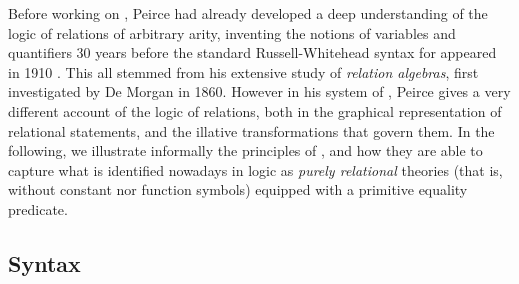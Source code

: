 \begin{scope}

Before working on , Peirce had already developed a deep understanding of the
logic of relations of arbitrary arity, inventing the notions of variables and
quantifiers 30 years before the standard Russell-Whitehead syntax for  appeared in 1910 \cite{sep-peirce}. This all stemmed from his extensive
study of \emph{relation algebras}, first investigated by De Morgan in 1860.
However in his system  of , Peirce gives a very different account of
the logic of relations, both in the graphical representation of relational
statements, and the illative transformations that govern them. In the following,
we illustrate informally the principles of , and how they are able to
capture what is identified nowadays in  logic as \emph{purely
relational}  theories (that is, without constant nor function
symbols) equipped with a primitive equality predicate.

\subsection{Syntax}


\end{scope}
